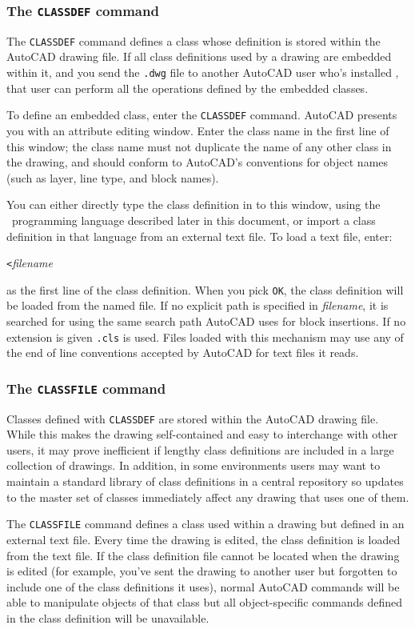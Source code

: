 \documentclass{article}
\begin{document}
\subsubsection{The {\tt CLASSDEF} command}

The {\tt CLASSDEF} command defines a class whose definition is stored
within the AutoCAD drawing file.  If all class definitions used by
a drawing are embedded within it, and you send the {\tt .dwg}
file to another AutoCAD user who's installed \cw , that user can
perform all the operations defined by the embedded classes.

To define an embedded class, enter the {\tt CLASSDEF} command.
AutoCAD presents you with an attribute editing window.  Enter the
class name in the first line of this window; the class name must not
duplicate the name of any other class in the drawing, and should
conform to AutoCAD's conventions for object names (such as layer, line
type, and block names).

You can either directly type the class definition in to this window,
using the \cw\ programming language described later in
this document, or import a class definition in that language from an
external text file.  To load a text file, enter:

{\tt <}{\em filename}

as the first line of the class definition.  When you pick {\tt OK},
the class definition will be loaded from the named file.  If no
explicit path is specified in {\em filename}, it is searched for using
the same search path AutoCAD uses for block insertions.  If no
extension is given {\tt .cls} is used.  Files loaded with this
mechanism may use any of the end of line conventions accepted by
AutoCAD for text files it reads.

\subsubsection{The {\tt CLASSFILE} command}

Classes defined with {\tt CLASSDEF} are stored within the AutoCAD
drawing file.  While this makes the drawing self-contained and easy to
interchange with other users, it may prove inefficient if lengthy
class definitions are included in a large collection of drawings.  In
addition, in some environments users may want to maintain a standard
library of class definitions in a central repository
so updates to the master set of classes immediately
affect any drawing that uses one of them.

The {\tt CLASSFILE} command defines a class used within a drawing
but defined in an external text file.  Every time the drawing is
edited, the class definition is loaded from the text file.  If the
class definition file cannot be located when the drawing is edited
(for example, you've sent the drawing to another user but forgotten to
include one of the class definitions it uses), normal AutoCAD commands
will be able to manipulate objects of that class but all
object-specific commands defined in the class definition will be
unavailable.
\end{document}
